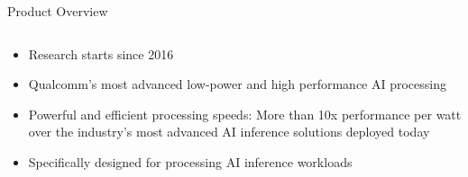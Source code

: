 \documentclass[12pt]{beamer}
\begin{document}
\begin{frame}{Product Overview}
\begin{columns}
\begin{column}{0.5\linewidth}
            \begin{itemize}
                \scriptsize
                \item Research starts since 2016
                \item Qualcomm's most advanced low-power and high performance AI processing
                \item Powerful and efficient processing speeds: More than 10x performance per watt over the industry's most advanced AI inference solutions deployed today
                \item Specifically designed for processing AI inference workloads
            \end{itemize}
        \end{column}
    \end{columns}
\end{frame}
\end{document}
